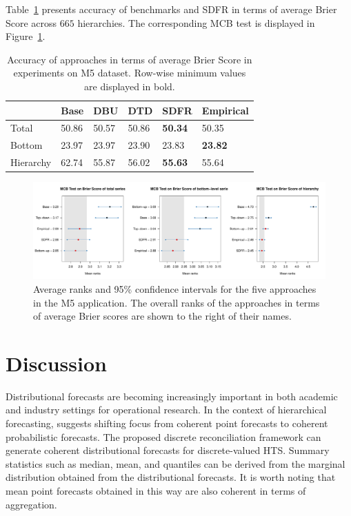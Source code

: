 \documentclass[a4paper,review,12pt,authoryear]{elsarticle}
\theoremstyle{definition}
\begin{document}
    Table~\ref{tab:M5} presents accuracy of benchmarks and SDFR in terms of average Brier Score across $665$ hierarchies. The corresponding MCB test is displayed in Figure~\ref{fig:application_M5}.

    \begin{table}
        \centering
        \begin{tabular}{llllll}\toprule
            ~ & Base & DBU & DTD & SDFR & Empirical \\ \midrule
            Total & 50.86 & 50.57 & 50.86 & \textbf{50.34} & 50.35 \\ 
            Bottom & 23.97 & 23.97 & 23.90 & 23.83 & \textbf{23.82} \\ 
            Hierarchy & 62.74 & 55.87 & 56.02 & \textbf{55.63} & 55.64 \\ \bottomrule
        \end{tabular}
        \caption{\label{tab:M5}Accuracy of approaches  in terms of average Brier Score in experiments on M5 dataset. Row-wise minimum values are displayed in bold.}
    \end{table}


    \begin{figure}[h]
      \caption{\label{fig:application_M5}Average ranks and 95\% confidence intervals for the five approaches in the M5 application. The overall ranks of the approaches in terms of average Brier scores are shown to the right of their names.}
      \centering
      \includegraphics[width=\textwidth]{figures/M5_mcb.pdf}
    \end{figure}

     \section{Discussion}
     \label{sec:discussion}



     Distributional forecasts are becoming increasingly important in both academic and industry settings for operational research. In the context of hierarchical forecasting, \cite{kolassaWeWantCoherent2022} suggests shifting focus from coherent point forecasts to coherent probabilistic forecasts.
     The proposed discrete reconciliation framework can generate coherent distributional forecasts for discrete-valued HTS.
     Summary statistics such as median, mean, and quantiles can be derived from the marginal distribution obtained from the distributional forecasts.
     It is worth noting that mean point forecasts obtained in this way are also coherent in terms of aggregation.
\end{document}
